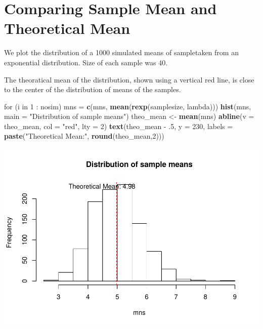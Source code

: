 \documentclass[]{article}
\newenvironment{Shaded}{\begin{snugshade}}{\end{snugshade}}
\newcommand{\KeywordTok}[1]{\textcolor[rgb]{0.13,0.29,0.53}{\textbf{{#1}}}}
\newcommand{\DataTypeTok}[1]{\textcolor[rgb]{0.13,0.29,0.53}{{#1}}}
\newcommand{\DecValTok}[1]{\textcolor[rgb]{0.00,0.00,0.81}{{#1}}}
\newcommand{\StringTok}[1]{\textcolor[rgb]{0.31,0.60,0.02}{{#1}}}
\newcommand{\NormalTok}[1]{{#1}}
\begin{document}
\section{Comparing Sample Mean and Theoretical
Mean}\label{comparing-sample-mean-and-theoretical-mean}

We plot the distribution of a 1000 simulated means of sampletaken from
an exponential distribution. Size of each sample was 40.

The theoratical mean of the distribution, shown using a vertical red
line, is close to the center of the distribution of means of the
samples.

\begin{Shaded}
\begin{Highlighting}[]
\NormalTok{for (i in }\DecValTok{1} \NormalTok{:}\StringTok{ }\NormalTok{nosim) mns =}\StringTok{ }\KeywordTok{c}\NormalTok{(mns, }\KeywordTok{mean}\NormalTok{(}\KeywordTok{rexp}\NormalTok{(samplesize, lambda)))}
\KeywordTok{hist}\NormalTok{(mns, }\DataTypeTok{main =} \StringTok{"Distribution of sample means"}\NormalTok{)}
\NormalTok{theo_mean <-}\StringTok{ }\KeywordTok{mean}\NormalTok{(mns)}
\KeywordTok{abline}\NormalTok{(}\DataTypeTok{v =} \NormalTok{theo_mean, }\DataTypeTok{col =} \StringTok{"red"}\NormalTok{, }\DataTypeTok{lty =} \DecValTok{2}\NormalTok{)}
\KeywordTok{text}\NormalTok{(theo_mean -}\StringTok{ }\NormalTok{.}\DecValTok{5}\NormalTok{, }\DataTypeTok{y =} \DecValTok{230}\NormalTok{, }\DataTypeTok{labels =} \KeywordTok{paste}\NormalTok{(}\StringTok{"Theoretical Mean:"}\NormalTok{, }\KeywordTok{round}\NormalTok{(theo_mean,}\DecValTok{2}\NormalTok{)))}
\end{Highlighting}
\end{Shaded}

\includegraphics{Part_1_files/figure-latex/unnamed-chunk-2-1.pdf}
\end{document}
